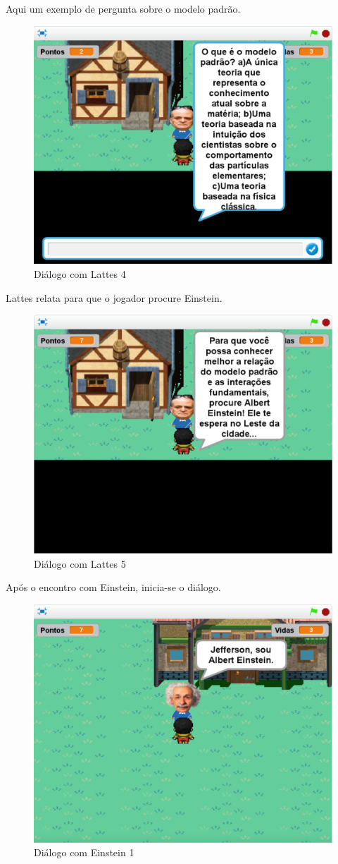 \documentclass[12pt,fleqn]{book} %
\begin{document}
Aqui um exemplo de pergunta sobre o modelo padrão.

\begin{figure}[h]
	\centering
	\includegraphics[width=0.65 \textwidth]{Produto/jogo_13}
	\caption{Diálogo com Lattes 4}
	\label{fig:app_a:jogo13}
\end{figure}

\newpage

Lattes relata para que o jogador procure Einstein.

\begin{figure}[h]
	\centering
	\includegraphics[width=0.65 \textwidth]{Produto/jogo_14}
	\caption{Diálogo com Lattes 5}
	\label{fig:app_a:jogo14}
\end{figure}

Após o encontro com Einstein, inicia-se o diálogo.

\begin{figure}[h]
	\centering
	\includegraphics[width=0.65 \textwidth]{Produto/jogo_15}
	\caption{Diálogo com Einstein 1}
	\label{fig:app_a:jogo15}
\end{figure}
\end{document}

